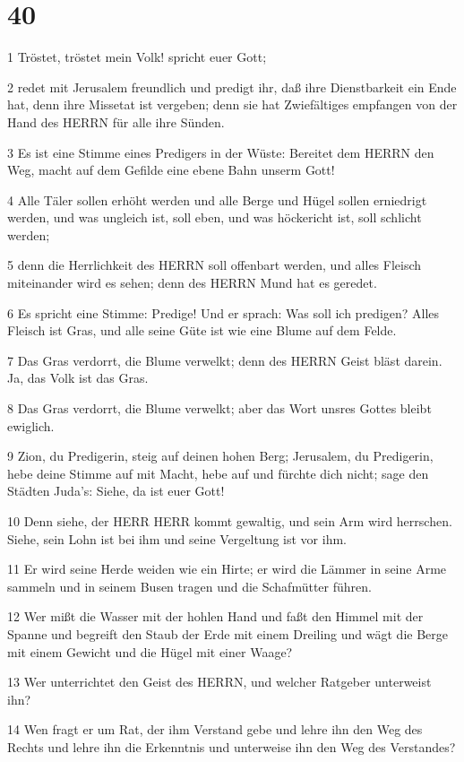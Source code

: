 \chapter{40}

\par 1 Tröstet, tröstet mein Volk! spricht euer Gott;
\par 2 redet mit Jerusalem freundlich und predigt ihr, daß ihre Dienstbarkeit ein Ende hat, denn ihre Missetat ist vergeben; denn sie hat Zwiefältiges empfangen von der Hand des HERRN für alle ihre Sünden.
\par 3 Es ist eine Stimme eines Predigers in der Wüste: Bereitet dem HERRN den Weg, macht auf dem Gefilde eine ebene Bahn unserm Gott!
\par 4 Alle Täler sollen erhöht werden und alle Berge und Hügel sollen erniedrigt werden, und was ungleich ist, soll eben, und was höckericht ist, soll schlicht werden;
\par 5 denn die Herrlichkeit des HERRN soll offenbart werden, und alles Fleisch miteinander wird es sehen; denn des HERRN Mund hat es geredet.
\par 6 Es spricht eine Stimme: Predige! Und er sprach: Was soll ich predigen? Alles Fleisch ist Gras, und alle seine Güte ist wie eine Blume auf dem Felde.
\par 7 Das Gras verdorrt, die Blume verwelkt; denn des HERRN Geist bläst darein. Ja, das Volk ist das Gras.
\par 8 Das Gras verdorrt, die Blume verwelkt; aber das Wort unsres Gottes bleibt ewiglich.
\par 9 Zion, du Predigerin, steig auf deinen hohen Berg; Jerusalem, du Predigerin, hebe deine Stimme auf mit Macht, hebe auf und fürchte dich nicht; sage den Städten Juda's: Siehe, da ist euer Gott!
\par 10 Denn siehe, der HERR HERR kommt gewaltig, und sein Arm wird herrschen. Siehe, sein Lohn ist bei ihm und seine Vergeltung ist vor ihm.
\par 11 Er wird seine Herde weiden wie ein Hirte; er wird die Lämmer in seine Arme sammeln und in seinem Busen tragen und die Schafmütter führen.
\par 12 Wer mißt die Wasser mit der hohlen Hand und faßt den Himmel mit der Spanne und begreift den Staub der Erde mit einem Dreiling und wägt die Berge mit einem Gewicht und die Hügel mit einer Waage?
\par 13 Wer unterrichtet den Geist des HERRN, und welcher Ratgeber unterweist ihn?
\par 14 Wen fragt er um Rat, der ihm Verstand gebe und lehre ihn den Weg des Rechts und lehre ihn die Erkenntnis und unterweise ihn den Weg des Verstandes?
